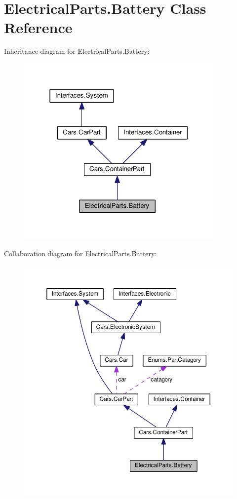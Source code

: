 \hypertarget{classElectricalParts_1_1Battery}{}\section{Electrical\+Parts.\+Battery Class Reference}
\label{classElectricalParts_1_1Battery}


Inheritance diagram for Electrical\+Parts.\+Battery\+:
\nopagebreak
\begin{figure}[H]
\begin{center}
\leavevmode
\includegraphics[width=289pt]{classElectricalParts_1_1Battery__inherit__graph}
\end{center}
\end{figure}


Collaboration diagram for Electrical\+Parts.\+Battery\+:
\nopagebreak
\begin{figure}[H]
\begin{center}
\leavevmode
\includegraphics[width=350pt]{classElectricalParts_1_1Battery__coll__graph}
\end{center}
\end{figure}
